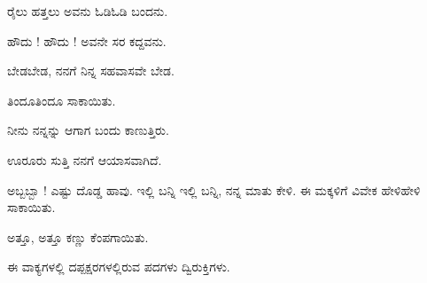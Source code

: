\noindent\hspace*{2.2em}ರೈಲು ಹತ್ತಲು ಅವನು ಓಡಿಓಡಿ ಬಂದನು.\par

\noindent\hspace*{2.2em}ಹೌದು ! ಹೌದು ! ಅವನೇ ಸರ ಕದ್ದವನು.\par

\noindent\hspace*{2.2em}ಬೇಡಬೇಡ, ನನಗೆ ನಿನ್ನ ಸಹವಾಸವೇ ಬೇಡ.\par

\noindent\hspace*{2.2em}ತಿಂದೂತಿಂದೂ ಸಾಕಾಯಿತು.\par

\noindent\hspace*{2.2em}ನೀನು ನನ್ನನ್ನು ಆಗಾಗ ಬಂದು ಕಾಣುತ್ತಿರು.\par

\noindent\hspace*{2.2em}ಊರೂರು ಸುತ್ತಿ ನನಗೆ ಆಯಾಸವಾಗಿದೆ.\par

\indent ಅಬ್ಬಬ್ಬಾ ! ಎಷ್ಟು ದೊಡ್ಡ ಹಾವು. ಇಲ್ಲಿ ಬನ್ನಿ ಇಲ್ಲಿ ಬನ್ನಿ, ನನ್ನ ಮಾತು ಕೇಳಿ. ಈ ಮಕ್ಕಳಿಗೆ ವಿವೇಕ ಹೇಳಿಹೇಳಿ ಸಾಕಾಯಿತು.\par

\noindent\hspace*{2.2em}ಅತ್ತೂ, ಅತ್ತೂ ಕಣ್ಣು ಕೆಂಪಗಾಯಿತು.\par

\indent ಈ ವಾಕ್ಯಗಳಲ್ಲಿ ದಪ್ಪಕ್ಷರಗಳಲ್ಲಿರುವ ಪದಗಳು ದ್ವಿರುಕ್ತಿಗಳು.\par
